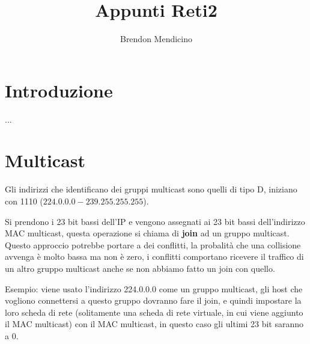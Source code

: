 \documentclass[12pt]{article}
\title{Appunti Reti2}
\author{Brendon Mendicino}
\begin{document}
\maketitle
\newpage
\tableofcontents
\newpage


\section{Introduzione}\label{sec:introduzione}
...


\section{Multicast}
Gli indirizzi che identificano dei gruppi multicast sono quelli di tipo D, iniziano con 1110 ($224.0.0.0 - 239.255.255.255$).

Si prendono i 23 bit bassi dell'IP e vengono assegnati ai 23 bit bassi dell'indirizzo MAC multicast, questa operazione si chiama di \textbf{join} ad un gruppo multicast. Questo approccio potrebbe portare a dei conflitti, la probalit\`a che una collisione avvenga \`e molto bassa ma non \`e zero, i conflitti comportano ricevere il traffico di un altro gruppo multicast anche se non abbiamo fatto un join con quello.

Esempio: viene usato l'indirizzo 224.0.0.0 come un gruppo multicast, gli host che vogliono connettersi a questo gruppo dovranno fare il join, e quindi impostare la loro scheda di rete (solitamente una scheda di rete virtuale, in cui viene aggiunto il MAC multicast) con il MAC multicast, in questo caso gli ultimi 23 bit saranno a 0.
\end{document}
